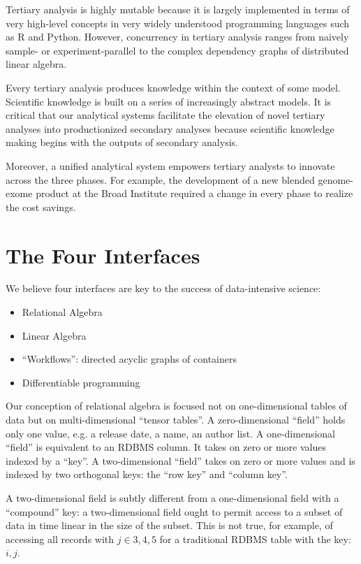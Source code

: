 \documentclass[10pt,a4paper%
]{article}
\begin{document}
Tertiary analysis is highly mutable because it is largely implemented in terms of very high-level concepts in very widely understood programming languages such as R and Python.
However, concurrency in tertiary analysis ranges from naively sample- or experiment-parallel to the complex dependency graphs of distributed linear algebra.

Every tertiary analysis produces knowledge within the context of some model. Scientific knowledge is built on a series of increasingly abstract models.
It is critical that our analytical systems facilitate the elevation of novel tertiary analyses into productionized secondary analyses because scientific knowledge making begins with the outputs of secondary analysis.

Moreover, a unified analytical system empowers tertiary analysts to innovate across the three phases.
For example, the development of a new blended genome-exome product at the Broad Institute required a change in every phase to realize the cost savings.

\section{The Four Interfaces}

We believe four interfaces are key to the success of data-intensive science:

\begin{itemize}
\item Relational Algebra
\item Linear Algebra
\item ``Workflows'': directed acyclic graphs of containers
\item Differentiable programming
\end{itemize}

Our conception of relational algebra is focused not on one-dimensional tables of data but on multi-dimensional ``tensor tables''.
A zero-dimensional ``field'' holds only one value, e.g. a release date, a name, an author list. A one-dimensional ``field'' is equivalent to an RDBMS column.
It takes on zero or more values indexed by a ``key''. A two-dimensional ``field'' takes on zero or more values and is indexed by two orthogonal keys: the ``row key'' and ``column key''.

A two-dimensional field is subtly different from a one-dimensional field with a ``compound'' key: a two-dimensional field ought to permit access to a subset of data in time linear in the size of the subset.
This is not true, for example, of accessing all records with $j \in {3, 4, 5}$ for a traditional RDBMS table with the key: $i, j$.
\end{document}
